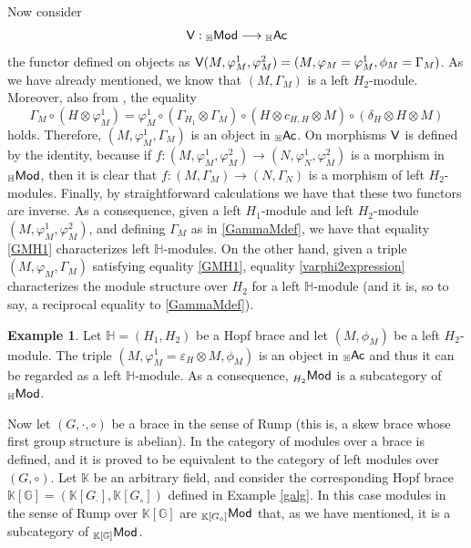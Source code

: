 \documentclass[11pt,reqno]{amsart}
\theoremstyle{plain}%
\theoremstyle{definition}
\newtheorem{example}[theorem]{Example}%
\theoremstyle{remark}
\begin{document}
Now consider $${\sf V}:{}_{\mathbb H}\sf{Mod}\longrightarrow{} _{\mathbb H}\sf{Ac}$$ the functor defined on objects as ${\sf V}(M, \varphi_M^1, \varphi_M^2) = (M, \varphi_M=\varphi_M^1, \phi_M = \Gamma_M)$. As we have already mentioned, we know that $(M,\Gamma_{M})$ is a left $H_{2}$-module. Moreover, also from \cite[Lemma 2.11]{VGRRProj}, the equality
\begin{equation}
	\label{GMH1}
	\Gamma_{M}\circ (H\otimes \varphi_{M}^1)=\varphi_{M}^1\circ (\Gamma_{H_1}\otimes \Gamma_{M})\circ (H\otimes c_{H,H}\otimes M)\circ (\delta_{H}\otimes H\otimes M)
\end{equation}
holds. Therefore, $(M, \varphi_M^1, \Gamma_M)$ is an object in  ${}_{\mathbb H}\sf{Ac}$. On morphisms ${\sf V}$ is defined by the identity, because if $f: (M, \varphi_M^1, \varphi_M^2)\to (N, \varphi_N^1, \varphi_M^2)$ is a morphism in ${}_{\mathbb H}{\sf Mod}$, then it is clear that $f:(M, \Gamma_M)\to (N, \Gamma_N)$ is a morphism of left $H_2$-modules. Finally, by straightforward calculations we have that these two functors are inverse. As a consequence, given a left $H_1$-module and left $H_2$-module $(M, \varphi_M^1, \varphi_M^2)$, and defining $\Gamma_M$ as in \eqref{GammaMdef}, we have that equality \eqref{GMH1} characterizes left $\mathbb H$-modules. On the other hand, given a triple $(M, \varphi_M, \Gamma_M)$  satisfying equality \eqref{GMH1}, equality \eqref{varphi2expression} characterizes the module structure over $H_2$ for a left $\mathbb H$-module (and it is, so to say, a reciprocal equality to \eqref{GammaMdef}). 

\begin{example}\label{ex-mod-Rump}
	Let ${\mathbb H} = (H_1, H_2)$ be a Hopf brace and let $(M,\phi_{M})$ be a left $H_{2}$-module. The triple $(M,\varphi_{M}^{1}=\varepsilon_{H}\otimes M, \phi_{M})$ is an object in ${}_{\mathbb H}\sf{Ac}$ and thus it can be regarded as a left $\mathbb{H}$-module. As a consequence, $_{H_2}\sf{Mod}$ is a subcategory of $_{\mathbb H}\sf{Mod}$. 
	
	Now let $(G, \cdot, \circ)$ be a  brace in the sense of Rump  (this is, a skew brace whose first group structure is abelian). In \cite{Rump} the category of modules over a brace is defined, and it is proved to be equivalent to the category of left modules over $(G, \circ)$. Let $\mathbb K$ be an arbitrary field, and consider the corresponding Hopf brace ${\mathbb K[{\mathbb G}]} = ({\mathbb K}[G_{\cdot}], {\mathbb K}[G_{\circ}])$ defined in Example \ref{galg}. In this case modules in the sense of Rump over ${\mathbb K[{\mathbb G}]}$ are $_{{\mathbb K}[G_{\circ}]}\sf{Mod}$ that, as we have mentioned, it is a subcategory of $_{\mathbb K[{\mathbb G}]}{\sf Mod}$.
\end{example}
\end{document}
